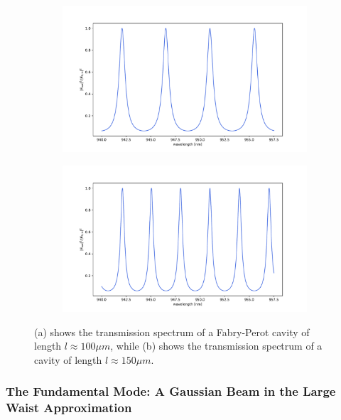 \begin{figure}[h!]
    \centering
    \begin{subfigure}[b]{0.49\textwidth}
        \includegraphics[width=\textwidth]{figures/100um_broadband_trans.pdf}
        \caption{}
    \end{subfigure}
    \begin{subfigure}[b]{0.49\textwidth}
        \includegraphics[width=\textwidth]{figures/150um_broadband_trans.pdf}
        \caption{}
    \end{subfigure}
    \caption{(a) shows the transmission spectrum of a Fabry-Perot cavity of length $l \approx 100 \mu m$, while (b) shows the transmission spectrum of a cavity of length $l \approx 150 \mu m$.}
    \label{fig:fabry_perot_FSR_comparison}
\end{figure}


\subsubsection{The Fundamental Mode: A Gaussian Beam in the Large Waist Approximation}

